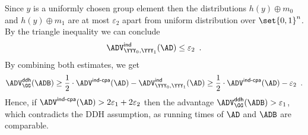 \documentclass{crypto-exercise}
\newcommand{\ADVINDCPA}[2]{\ADV^{\mathsf{ind\text{-}cpa}}_{#1}(#2)}
\renewcommand{\ADVIND}[2]{\ADV^{\mathsf{ind}}_{#1}(#2)}
\begin{document}
Since $y$ is a uniformly chosen group element then the distributions
$h(y)\oplus m_0$ and $h(y)\oplus m_1$ are at most $\varepsilon_2$
apart from uniform distribution over $\set{0,1}^n$. By the triangle
inequality we can conclude
\begin{align*}
  \ADVIND{\YYY_0,\YYY_1}{\AD}\leq \varepsilon_2\enspace.
\end{align*}
By combining both estimates, we get
\begin{align*}
  \ADVDDH{\GG}{\ADB}\geq
  \frac{1}{2}\cdot\advINDCPAXX{}{\AD}-\advINDXX{\YYY_0,\YYY_1}{\AD}
  \geq \frac{1}{2}\cdot\advINDCPAXX{}{\AD}-\varepsilon_2\enspace.
\end{align*}
Hence, if $\ADVINDCPA{}{\AD} >2\varepsilon_1+2\varepsilon_2$ then
the advantage $\ADVDDH{\GG}{\ADB}>\varepsilon_1$, which contradicts
the DDH assumption, as running times of $\AD$ and $\ADB$ are
comparable.
\end{document}
